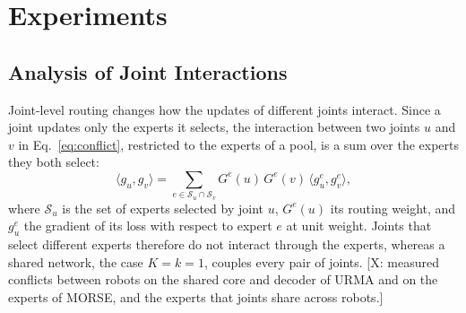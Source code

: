 \section{Experiments}
\label{sec:experiments}

\subsection{Analysis of Joint Interactions}
\label{sec:analysis}

Joint-level routing changes how the updates of different joints interact. Since a joint updates only the experts it
selects, the interaction between two joints $u$ and $v$ in Eq.~\eqref{eq:conflict}, restricted to the experts of a
pool, is a sum over the experts they both select:
\begin{equation}
\bigl\langle g_u,g_v\bigr\rangle=\sum_{e\in\mathcal{S}_u\cap\mathcal{S}_v}G^e(u)\,G^e(v)\,
\bigl\langle g^e_u,g^e_v\bigr\rangle,
\label{eq:localized}
\end{equation}
where $\mathcal{S}_u$ is the set of experts selected by joint $u$, $G^e(u)$ its routing weight, and $g^e_u$ the
gradient of its loss with respect to expert $e$ at unit weight. Joints that select different experts therefore do not
interact through the experts, whereas a shared network, the case $K=k=1$, couples every pair of joints. [X: measured
conflicts between robots on the shared core and decoder of URMA and on the experts of MORSE, and the experts that
joints share across robots.]
